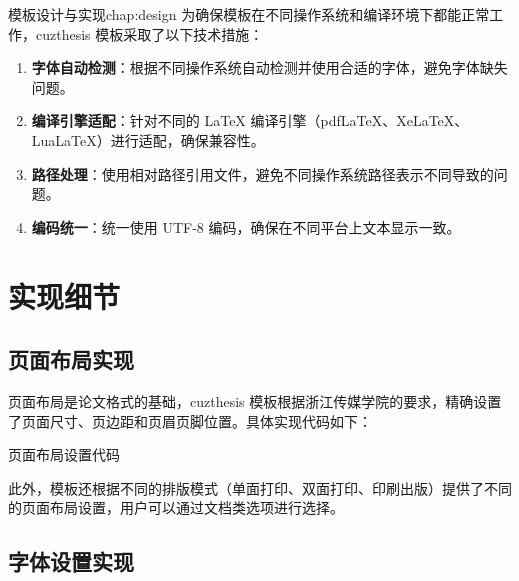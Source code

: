 \begin{cuzchapter}{模板设计与实现}{chap:design}
    为确保模板在不同操作系统和编译环境下都能正常工作，cuzthesis 模板采取了以下技术措施：

    \begin{enumerate}
        \item \textbf{字体自动检测}：根据不同操作系统自动检测并使用合适的字体，避免字体缺失问题。

        \item \textbf{编译引擎适配}：针对不同的 LaTeX 编译引擎（pdfLaTeX、XeLaTeX、LuaLaTeX）进行适配，确保兼容性。

        \item \textbf{路径处理}：使用相对路径引用文件，避免不同操作系统路径表示不同导致的问题。

        \item \textbf{编码统一}：统一使用 UTF-8 编码，确保在不同平台上文本显示一致。
    \end{enumerate}

    \section{实现细节}\label{sec:implementation-details}

    \subsection{页面布局实现}

    页面布局是论文格式的基础，cuzthesis 模板根据浙江传媒学院的要求，精确设置了页面尺寸、页边距和页眉页脚位置。具体实现代码如下：

    \begin{listing}[htbp]
        \caption{页面布局设置代码}
        \label{code:page-layout}
        \begin{texcode}
            \RequirePackage{geometry}
            \geometry{
                paper=a4paper,
                top=2.5cm, bottom=2.5cm,
                left=3cm, right=2cm,
                headheight=0.5cm, footskip=0.8cm
            }
        \end{texcode}
    \end{listing}

    此外，模板还根据不同的排版模式（单面打印、双面打印、印刷出版）提供了不同的页面布局设置，用户可以通过文档类选项进行选择。

    \subsection{字体设置实现}


\end{cuzchapter}
